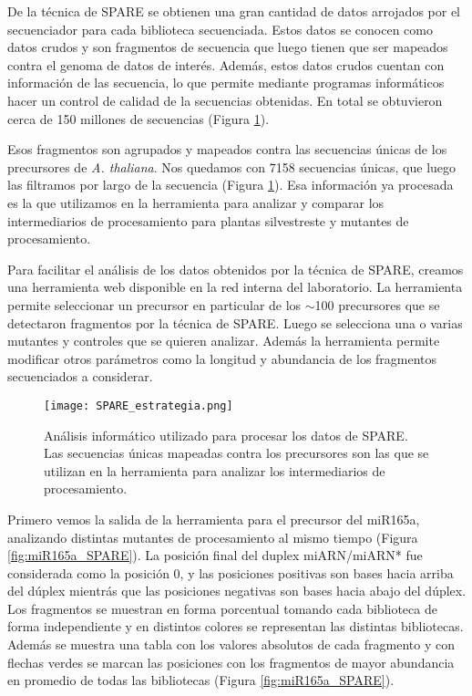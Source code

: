 De la técnica de SPARE se obtienen una gran cantidad de datos arrojados por el secuenciador para cada biblioteca secuenciada.
Estos datos se conocen como datos crudos y son fragmentos de secuencia que luego tienen que ser mapeados contra el genoma de datos de interés.
Además, estos datos crudos cuentan con información de las secuencia, lo que permite mediante programas informáticos hacer un control de calidad de la secuencias obtenidas.
En total se obtuvieron cerca de 150 millones de secuencias (Figura \ref{fig:SPARE_estrategia}).

Esos fragmentos son agrupados y mapeados contra las secuencias únicas de los precursores de \textit{A. thaliana}.
Nos quedamos con 7158 secuencias únicas, que luego las filtramos por largo de la secuencia (Figura \ref{fig:SPARE_estrategia}).
Esa información ya procesada es la que utilizamos en la herramienta para analizar y comparar los intermediarios de procesamiento para plantas silvestreste y mutantes de procesamiento.

Para facilitar el análisis de los datos obtenidos por la técnica de SPARE, creamos una herramienta web disponible en la red interna del laboratorio.
La herramienta permite seleccionar un precursor en particular de los $\sim$100 precursores que se detectaron fragmentos por la técnica de SPARE.
Luego se selecciona una o varias mutantes y controles que se quieren analizar.
Además la herramienta permite modificar otros parámetros como la longitud y abundancia de los fragmentos secuenciados a considerar.

\begin{figure}[htbp!] 
	\centering    
	\texttt{[image: SPARE\_estrategia.png]}
	\caption[Análisis informático utilizado para procesar los datos de SPARE]{
	Análisis informático utilizado para procesar los datos de SPARE.
	Las secuencias únicas mapeadas contra los precursores son las que se utilizan en la herramienta para analizar los intermediarios de procesamiento.
	}
	 \label{fig:SPARE_estrategia}
\end{figure}

Primero vemos la salida de la herramienta para el precursor del  miR165a, analizando distintas mutantes de procesamiento al mismo tiempo (Figura \ref{fig:miR165a_SPARE}).
La posición final del duplex miARN/miARN* fue considerada como la posición 0, y las posiciones positivas son bases hacia arriba del dúplex mientrás que las posiciones negativas son bases hacia abajo del dúplex.
Los fragmentos se muestran en forma porcentual tomando cada biblioteca de forma independiente y en distintos colores se representan las distintas bibliotecas.
Además se muestra una tabla con los valores absolutos de cada fragmento y con flechas verdes se marcan las posiciones con los fragmentos de mayor abundancia en promedio de todas las bibliotecas (Figura \ref{fig:miR165a_SPARE}).
 

